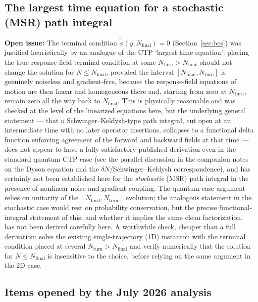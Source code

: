 \documentclass[a4paper,11pt]{article}
\renewcommand{\leq}{\leqslant}
\newenvironment{todo}{\begin{tcolorbox}[enhanced,breakable,colback=SussexBurntOrange!10,colframe=SussexBurntOrange!40]\small{\textsf{\textbf{Open issue:} }}}{\end{tcolorbox}}
\newcommand{\Ny}{N}                          %
\newcommand{\Nfinal}{N_{\mathrm{final}}}     %
\newcommand{\field}{\phi}                    %
\newcommand{\rfield}{\widetilde\field}       %
\newcommand{\yco}{y}                         %
\begin{document}
\subsection{The largest time equation for a stochastic (MSR) path integral}

\begin{todo}
The terminal condition $\rfield(\yco,\Nfinal)=0$ (Section~\ref{sec:bcs})
was justified heuristically by an analogue of the CTP `largest time
equation': placing the true response-field terminal condition at some
$\Ny_{\mathrm{turn}} > \Nfinal$ should not change the solution for
$\Ny \leq \Nfinal$, provided the interval $[\Nfinal,\Ny_{\mathrm{turn}}]$ is
genuinely noiseless and gradient-free, because the response-field
equations of motion are then linear and homogeneous there and, starting
from zero at $\Ny_{\mathrm{turn}}$, remain zero all the way back to
$\Nfinal$. This is physically reasonable and was checked at the level of
the linearized equations here, but the underlying general statement ---
that a Schwinger--Keldysh-type path integral, cut open at an intermediate
time with no later operator insertions, collapses to a functional delta
function enforcing agreement of the forward and backward fields at that
time --- does not appear to have a fully satisfactory published derivation
even in the standard quantum CTP case (see the parallel discussion in the
companion notes on the Dyson equation and the $\delta N$/Schwinger--Keldysh
correspondence), and has certainly not been established here for the
\emph{stochastic} (MSR) path integral in the presence of nonlinear noise
and gradient coupling. The quantum-case argument relies on unitarity of
the $[\Nfinal,\Ny_{\mathrm{turn}}]$ evolution; the analogous statement in
the stochastic case would rest on probability conservation, but the
precise functional-integral statement of this, and whether it implies the
same clean factorization, has not been derived carefully here. A
worthwhile check, cheaper than a full derivation: solve the existing
single-trajectory (1D) instanton with the terminal condition placed at
several $\Ny_{\mathrm{turn}} > \Nfinal$ and verify numerically that the
solution for $\Ny \leq \Nfinal$ is insensitive to the choice, before
relying on the same argument in the 2D case.
\end{todo}


\subsection{Items opened by the July 2026 analysis}
\end{document}

